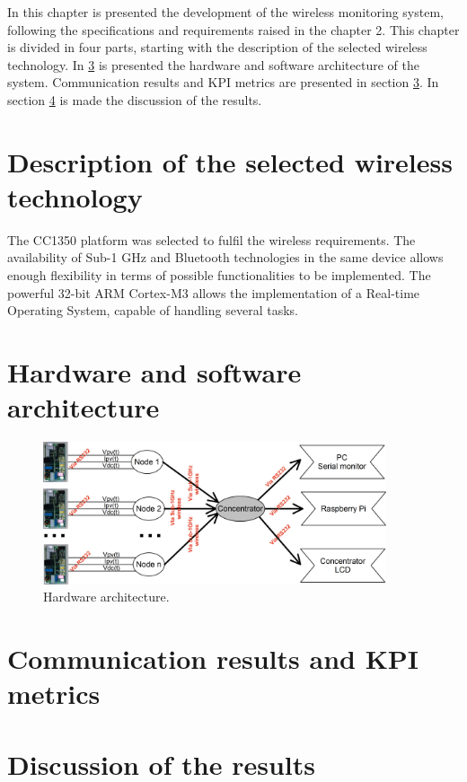 In this chapter is presented the development of the wireless monitoring system, following the specifications and requirements raised in the chapter 2. This chapter is divided in four parts, starting with the description of the selected wireless technology. In \ref{sec:3.3} is presented the hardware and software architecture of the system. Communication results and KPI metrics are presented in section \ref{sec:3.3}. In section \ref{sec:3.4} is made the discussion of the results.

\section{Description of the selected wireless technology}
\label{sec:3.1}

The CC1350 platform was selected to fulfil the wireless requirements. The availability of Sub-1 GHz and Bluetooth technologies in the same device allows enough flexibility in terms of possible functionalities to be implemented. The powerful 32-bit ARM Cortex-M3 allows the implementation of a Real-time Operating System, capable of handling several tasks.

\section{Hardware and software architecture}
\label{sec:3.2}


\begin{figure}[h!]
	\centering
	\includegraphics[width=0.9\textwidth,keepaspectratio]{figures/hw}
	\caption{Hardware architecture.}
	\label{fig:3.2.hw}
\end{figure}


\section{Communication results and KPI metrics}
\label{sec:3.3}
\lipsum[4-4]

\section{Discussion of the results}
\label{sec:3.4}
\lipsum[4-4]
